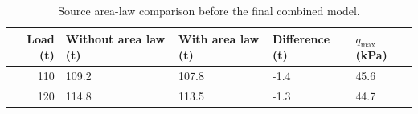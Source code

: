 \begin{table}[htbp]
\caption{Source area-law comparison before the final combined model.}
\label{tab:src17}
\small
\setlength{\tabcolsep}{3.5pt}
\begin{tabularx}{\linewidth}{@{}rXXXX@{}}
\toprule
Load (t) & Without area law (t) & With area law (t) & Difference (t) & $q_{\max}$ (kPa) \\
\midrule
110 & 109.2 & 107.8 & -1.4 & 45.6 \\
120 & 114.8 & 113.5 & -1.3 & 44.7 \\
\bottomrule
\end{tabularx}
\end{table}
